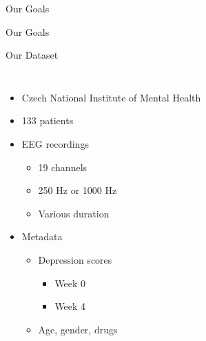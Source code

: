 \documentclass{beamer}
\begin{document}

\begin{frame}{Our Goals}
  
\end{frame}

\begin{frame}{Our Goals}
  
\end{frame}


%   


\begin{frame}{Our Dataset}
	\begin{columns}
        \begin{itemize}
            \item<1-> Czech National Institute of Mental Health
            \item<2-> 133 patients
            \item<3-> EEG recordings
              \begin{itemize}
                \item 19 channels
                \item 250 Hz or 1000 Hz
                \item Various duration
              \end{itemize}
              \item<4-> Metadata
                  \begin{itemize}
                      \item Depression scores
                          \begin{itemize}
                              \item Week 0
                              \item Week 4
                          \end{itemize}
                       \item Age, gender, drugs
                  \end{itemize}
        \end{itemize}

\end{columns}
\end{frame}
\end{document}

